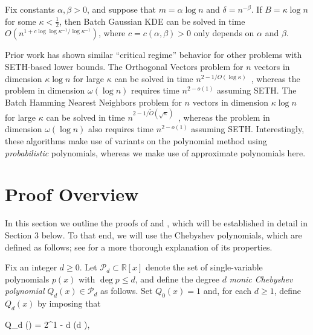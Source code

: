 \begin{corollary}

\label{fkappa} 

Fix constants $\alpha, \beta > 0$, and suppose that $m = \alpha \log n$ and $\delta = n^{-\beta}$. If $B = \kappa \log n$ for some $\kappa < \frac{1}{2}$, then Batch Gaussian KDE can be solved in time $O(n^{1 + c \log \log \kappa^{-1} / \log \kappa^{-1}})$, where $c = c(\alpha, \beta) > 0$ only depends on $\alpha$ and $\beta$.

\end{corollary}


Prior work has shown similar ``critical regime'' behavior for other problems with SETH-based lower bounds. The Orthogonal Vectors problem for $n$ vectors in dimension $\kappa \log n$ for large $\kappa$ can be solved in time $n^{2 - 1/O(\log \kappa)}$~\cite{abboud2014more,chan2016deterministic}, whereas the problem in dimension $\omega(\log n)$ requires time $n^{2 - o(1)}$ assuming SETH. The Batch Hamming Nearest Neighbors problem for $n$ vectors in dimension $\kappa \log n$ for large $\kappa$ can be solved in time $n^{2 - 1/\tilde{O}(\sqrt{\kappa})}$~\cite{alman2015probabilistic,alman2016polynomial}, whereas the problem in dimension $\omega(\log n)$ also requires time $n^{2 - o(1)}$ assuming SETH. Interestingly, these algorithms make use of variants on the polynomial method using \emph{probabilistic} polynomials, whereas we make use of approximate polynomials here.

\section{Proof Overview}

In this section we outline the proofs of  and , which will be established in detail in Section 3 below. To that end, we will use the Chebyshev polynomials, which are defined as follows; see  for a more thorough explanation of its properties.

	\begin{definition}
		
		\label{pd1} 
		
		Fix an integer $d \ge 0$. Let $\mathcal{P}_d \subset \mathbb{R} [x]$ denote the set of single-variable polynomials $p(x)$ with $\deg p \le d$, and define the degree $d$ \emph{monic Chebyshev polynomial} $Q_d (x) \in \mathcal{P}_d$ as follows. Set $Q_0 (x) = 1$ and, for each $d \ge 1$, define $Q_d (x)$ by imposing that
	\begin{flalign}
	\label{qdtheta}
	Q_d (\cos \theta) = 2^{1 - d} \cos (d \theta), \qquad {}
	\end{flalign}
		
	\end{definition}
	

